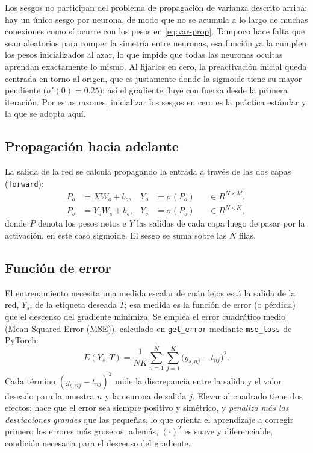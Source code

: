 \documentclass[11pt,a4paper]{article}
\begin{document}
Los sesgos no participan del problema de propagación de varianza descrito arriba:
hay un único sesgo por neurona, de modo que no se acumula a lo largo de muchas
conexiones como sí ocurre con los pesos en \cref{eq:var-prop}. Tampoco hace falta
que sean aleatorios para romper la simetría entre neuronas, esa función ya
la cumplen los pesos inicializados al azar, lo que impide que todas las neuronas
ocultas aprendan exactamente lo mismo. Al fijarlos en cero, la preactivación
inicial queda centrada en torno al origen, que es justamente donde la sigmoide
tiene su mayor pendiente ($\sigma'(0)=0.25$); así el gradiente fluye con fuerza
desde la primera iteración. Por estas razones, inicializar los sesgos en cero es
la práctica estándar y la que se adopta aquí.

\subsection{Propagación hacia adelante} \label{sec:forward}

La salida de la red se calcula propagando la entrada a través de las dos capas
(\texttt{forward}):
\begin{align}
  P_o &= X W_o + b_o,
    & Y_o &= \sigma(P_o)
    && \in R^{N \times M},\label{eq:fwd1}\\
  P_s &= Y_o W_s + b_s,
    & Y_s &= \sigma(P_s)
    && \in R^{N \times K}, \label{eq:fwd2}
\end{align}
donde $P$ denota los pesos netos e $Y$ las salidas de cada capa luego de pasar por la activación, en este caso sigmoide. El sesgo se suma sobre las $N$ filas.

\subsection{Función de error} \label{sec:error}

El entrenamiento necesita una medida escalar de cuán lejos está la salida de la
red, $Y_s$, de la etiqueta deseada $T$; esa medida es la
función de error (o pérdida) que el descenso del gradiente minimiza. Se
emplea el error cuadrático medio (Mean Squared Error (MSE)), calculado en
\texttt{get\_error} mediante \texttt{mse\_loss} de PyTorch:
\begin{equation}
  E(Y_s,T)
   = \frac{1}{N K}\sum_{n=1}^{N}\sum_{j=1}^{K}
     \bigl(y_{s,nj}-t_{nj}\bigr)^2 .
  \label{eq:mse}
\end{equation}
Cada término $(y_{s,nj}-t_{nj})^2$ mide la discrepancia entre la salida y el valor
deseado para la muestra $n$ y la neurona de salida $j$. Elevar al cuadrado tiene
dos efectos: hace que el error sea siempre positivo y simétrico, y \emph{penaliza
más las desviaciones grandes} que las pequeñas, lo que orienta el aprendizaje a
corregir primero los errores más groseros; además, $(\cdot)^2$ es suave y
diferenciable, condición necesaria para el descenso del gradiente. \\
\end{document}
